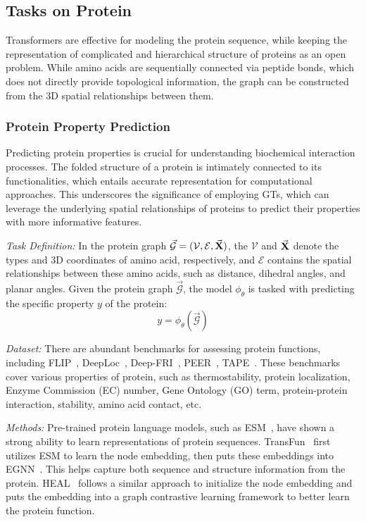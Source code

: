 \subsection{Tasks on Protein}
\label{sec:application-protein}
Transformers are effective for modeling the protein sequence, while keeping the representation of complicated and hierarchical structure of proteins as an open problem. While amino acids are sequentially connected via peptide bonds, which does not directly provide topological information, the graph can be constructed from the 3D spatial relationships between them.

\subsubsection{\textbf{Protein Property Prediction}}
Predicting protein properties is crucial for understanding biochemical interaction processes. 
The folded structure of a protein is intimately connected to its functionalities, which entails accurate representation for computational approaches. 
This underscores the significance of employing GTs, which can leverage the underlying spatial relationships of proteins to predict their properties with more informative features.


\textit{Task Definition:}
In the protein graph $\mathcal{\vec{G}} = (\mathcal V, \mathcal E, \vec{\mathbf{X}})$, the $\mathcal V$ and $\vec{\mathbf{X}}$ denote the types and 3D coordinates of amino acid, respectively, and $\mathcal E$ contains the spatial relationships between these amino acids, such as distance, dihedral angles, and planar angles. Given the protein graph $\mathcal{\vec{G}}$, the model $\phi_\theta$ is tasked with predicting the specific property $y$ of the protein:
\begin{equation}
    y = \phi_\theta(\mathcal{\vec{G}})
\end{equation}

\textit{Dataset:}
There are abundant benchmarks for assessing protein functions, including FLIP~\cite{dallago2021flip}, DeepLoc~\cite{almagro2017deeploc}, Deep-FRI~\cite{gligorijevic2021structure}, PEER~\cite{xu2022peer}, TAPE~\cite{rao2019evaluating}. These benchmarks cover various properties of protein, such as thermostability, protein localization, Enzyme Commission (EC) number, Gene Ontology (GO) term, protein-protein interaction, stability, amino acid contact, etc. 


\textit{Methods:} 
Pre-trained protein language models, such as ESM~\cite{lin2023evolutionary}, have shown a strong ability to learn representations of protein sequences. TransFun~\cite{boadu2023combining} first utilizes ESM to learn the node embedding, then puts these embeddings into EGNN~\cite{satorras2021n}. This helps capture both sequence and structure information from the protein. HEAL~\cite{gu2023hierarchical} follows a similar approach to initialize the node embedding and puts the embedding into a graph contrastive learning framework to better learn the protein function.

